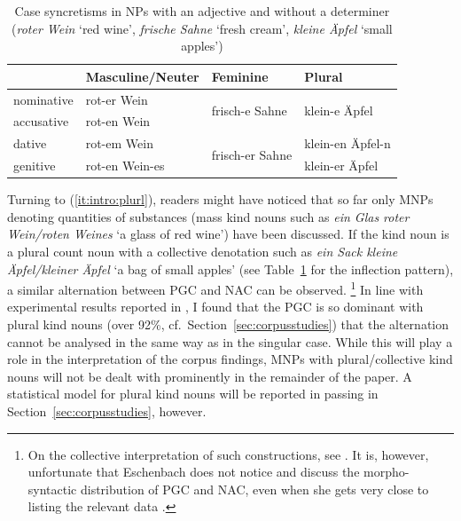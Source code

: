 \documentclass[USenglish]{article}
\begin{document}
\begin{table}
  \centering
  \begin{tabular}{llll}
     & Masculine\slash Neuter & Feminine & Plural \\
     \midrule
     nominative & rot-er Wein    & \multirow{2}{*}{frisch-e Sahne}   & \multirow{2}{*}{klein-e Äpfel} \\
     accusative & rot-en Wein    &                                   &                                \\
     dative     & rot-em Wein    & \multirow{2}{*}{frisch-er Sahne}  & klein-en Äpfel-n               \\
     genitive   & rot-en Wein-es &                                   & klein-er Äpfel                 \\
  \end{tabular}
  \caption{Case syncretisms in NPs with an adjective and without a determiner (\textit{roter Wein} `red wine', \textit{frische Sahne} `fresh cream', \textit{kleine Äpfel} `small apples')}
  \label{tab:syncretisms}
\end{table}

Turning to (\ref{it:intro:plurl}), readers might have noticed that so far only MNPs denoting quantities of substances (mass kind nouns such as \textit{ein Glas roter Wein\slash roten Weines} `a glass of red wine') have been discussed.
If the kind noun is a plural count noun with a collective denotation such as \textit{ein Sack kleine Äpfel\slash kleiner Äpfel} `a bag of small apples' (see Table~\ref{tab:syncretisms} for the inflection pattern), a similar alternation between PGC and NAC can be observed.%
\footnote{\label{fn:eschenbash}On the collective interpretation of such constructions, see \cite{Eschenbach1994}.
It is, however, unfortunate that Eschenbach does not notice and discuss the morpho-syntactic distribution of PGC and NAC, even when she gets very close to listing the relevant data \citep[217]{Eschenbach1994}.}
In line with experimental results reported in \citet[15--16]{Zimmer2015}, I found that the PGC is so dominant with plural kind nouns (over 92\%, cf.\ Section~\ref{sec:corpusstudies}) that the alternation cannot be analysed in the same way as in the singular case.
While this will play a role in the interpretation of the corpus findings, MNPs with plural\slash collective kind nouns will not be dealt with prominently in the remainder of the paper.
A statistical model for plural kind nouns will be reported in passing in Section~\ref{sec:corpusstudies}, however.
\end{document}
